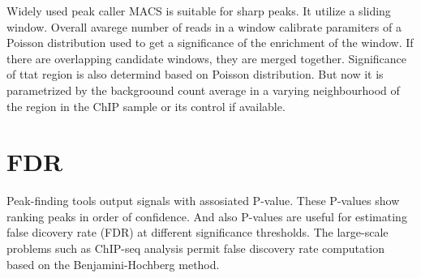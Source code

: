 Widely used peak caller MACS is suitable for sharp peaks.
It utilize a sliding window. 
Overall avarege number of reads in a window calibrate paramiters of a Poisson distribution used to get a significance of the enrichment of the window.
If there are overlapping candidate windows, they are merged together.
Significance of ttat region is also determind based on Poisson distribution.
But now it is parametrized by the backgroound count average in a varying neighbourhood of the region in the ChIP sample or its control if available.







\section{FDR}

Peak-finding tools output signals with assosiated P-value.
These P-values show ranking peaks in order of confidence.
And also P-values are useful for estimating false dicovery rate (FDR) at different significance thresholds.
% 
The large-scale problems such as ChIP-seq analysis permit false discovery rate computation based on the Benjamini-Hochberg method.



